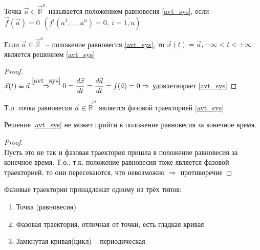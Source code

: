 \begin{definition}
	Точка $\vec{a} \in \vec{\mathbb{R}}^n$ называется положением равновесия \eqref{avt_sys}, если \\ $ \vec{f}(\vec{a}) = 0 \ \ (f^i(a^1, ..., a^n) = 0, \ i = \overline{1, n} )$
\end{definition}

\begin{proposition}
	Если $ \vec{a} \in \vec{\mathbb{R}}^n $ -- положение равновесия \eqref{avt_sys}, то $ \vec{x}(t) = \vec{a}, -\infty < t < + \infty$ является решением \eqref{avt_sys}
\end{proposition}

\begin{proof}
	\ \\
	$\vec{x}(t) \equiv \vec{a} \overset{\eqref{avt_sys}}{\Rightarrow} 0 = \dfrac{d\vec{x}}{dt} = \dfrac{d \vec{a}}{dt} = f(\vec{a}) = 0 \Rightarrow$ удовлетворяет \eqref{avt_sys}
\end{proof}
\noindent Т.о. точка равновесия $ \vec{a} \in \vec{\mathbb{R}}^n$ является фазовой траекторией \eqref{avt_sys}

\begin{corollary}
	Решение \eqref{avt_sys} не может прийти в положение равновесия за конечное время.
\end{corollary}

\begin{proof}
	\ \\
	Пусть это не так и фазовая траектория пришла в положение равновесия за конечное время. Т.о., т.к. положение равновесия тоже является фазовой траекторией, то они пересекаются, что невозможно $\Rightarrow$ противоречие 
\end{proof}

\begin{theorem}
	Фазовые траектории принадлежат одному из трёх типов:
	\begin{enumerate}
		\item Точка (равновесия)
		\item Фазовая траектория, отличная от точки, есть гладкая кривая
		\item Замкнутая кривая(цикл) -- периодическая
	\end{enumerate}
\end{theorem}